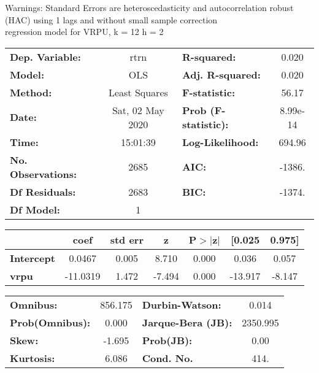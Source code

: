 Warnings: \newline
 [1] Standard Errors are heteroscedasticity and autocorrelation robust (HAC) using 1 lags and without small sample correction\\ 

regression model for VRPU, k = 12 h = 2\begin{center}
\begin{tabular}{lclc}
\toprule
\textbf{Dep. Variable:}    &       rtrn       & \textbf{  R-squared:         } &     0.020   \\
\textbf{Model:}            &       OLS        & \textbf{  Adj. R-squared:    } &     0.020   \\
\textbf{Method:}           &  Least Squares   & \textbf{  F-statistic:       } &     56.17   \\
\textbf{Date:}             & Sat, 02 May 2020 & \textbf{  Prob (F-statistic):} &  8.99e-14   \\
\textbf{Time:}             &     15:01:39     & \textbf{  Log-Likelihood:    } &    694.96   \\
\textbf{No. Observations:} &        2685      & \textbf{  AIC:               } &    -1386.   \\
\textbf{Df Residuals:}     &        2683      & \textbf{  BIC:               } &    -1374.   \\
\textbf{Df Model:}         &           1      & \textbf{                     } &             \\
\bottomrule
\end{tabular}
\begin{tabular}{lcccccc}
                   & \textbf{coef} & \textbf{std err} & \textbf{z} & \textbf{P$> |$z$|$} & \textbf{[0.025} & \textbf{0.975]}  \\
\midrule
\textbf{Intercept} &       0.0467  &        0.005     &     8.710  &         0.000        &        0.036    &        0.057     \\
\textbf{vrpu}      &     -11.0319  &        1.472     &    -7.494  &         0.000        &      -13.917    &       -8.147     \\
\bottomrule
\end{tabular}
\begin{tabular}{lclc}
\textbf{Omnibus:}       & 856.175 & \textbf{  Durbin-Watson:     } &    0.014  \\
\textbf{Prob(Omnibus):} &   0.000 & \textbf{  Jarque-Bera (JB):  } & 2350.995  \\
\textbf{Skew:}          &  -1.695 & \textbf{  Prob(JB):          } &     0.00  \\
\textbf{Kurtosis:}      &   6.086 & \textbf{  Cond. No.          } &     414.  \\
\bottomrule
\end{tabular}
\end{center}

